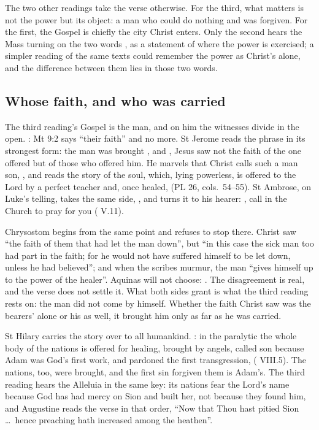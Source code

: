 The two other readings take the verse otherwise. For the third, what matters is
not the power but its object: a man who could do nothing and was forgiven. For
the first, the Gospel is chiefly the city Christ enters. Only the second hears
the Mass turning on the two words , as a statement of where the
power is exercised; a simpler reading of the same texts could remember the
power as Christ's alone, and the difference between them lies in those two
words.

\subsection{Whose faith, and who was carried}

The third reading's Gospel is the man, and on him the witnesses divide in the
open. : Mt 9:2 says ``their faith'' and no
more. St Jerome reads the phrase in its strongest form: the man was brought
, and , Jesus saw not the faith of
the one offered but of those who offered him. He marvels that Christ calls such
a man son, , and reads the
story of the soul, which, lying powerless, is offered to the Lord by a perfect
teacher and, once healed,  (PL 26, cols.~54--55). St Ambrose, on Luke's telling, takes the
same side, , and turns
it to his hearer: , call in the
Church to pray for you ( V.11).

Chrysostom begins from the same point and refuses to stop there. Christ saw
``the faith of them that had let the man down'', but ``in this case the sick man
too had part in the faith; for he would not have suffered himself to be let
down, unless he had believed''; and when the scribes murmur, the man ``gives
himself up to the power of the healer''. Aquinas will not choose: . The disagreement is real, and the verse does not settle it. What both
sides grant is what the third reading rests on: the man did not come by
himself. Whether the faith Christ saw was the bearers' alone or his as well, it
brought him only as far as he was carried.

St Hilary carries the story over to all humankind. : in the paralytic the whole
body of the nations is offered for healing, brought by angels, called son
because Adam was God's first work, and pardoned the first transgression,
 ( VIII.5). The nations, too, were brought, and the first sin forgiven
them is Adam's. The third reading hears the Alleluia in the same key: its
nations fear the Lord's name because God has had mercy on Sion and built her,
not because they found him, and Augustine reads the verse in that order, ``Now
that Thou hast pitied Sion \dots\ hence preaching hath increased among the
heathen''.

